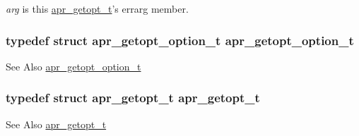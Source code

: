 {\itshape arg} is this {\ttfamily \hyperlink{structapr__getopt__t}{apr\-\_\-getopt\-\_\-t}'s} {\ttfamily errarg} member. \hypertarget{group__apr__getopt_ga114d2af52f3573eaeee2ffa73b2c4ff5}{
\subsubsection[{apr\-\_\-getopt\-\_\-option\-\_\-t}]{\setlength{\rightskip}{0pt plus 5cm}typedef struct {\bf apr\-\_\-getopt\-\_\-option\-\_\-t} {\bf apr\-\_\-getopt\-\_\-option\-\_\-t}}}\label{group__apr__getopt_ga114d2af52f3573eaeee2ffa73b2c4ff5}
\begin{DoxySeeAlso}{See Also}
\hyperlink{structapr__getopt__option__t}{apr\-\_\-getopt\-\_\-option\-\_\-t} 
\end{DoxySeeAlso}
\hypertarget{group__apr__getopt_gaed49565eab64803e93f76d0c40d6873d}{
\subsubsection[{apr\-\_\-getopt\-\_\-t}]{\setlength{\rightskip}{0pt plus 5cm}typedef struct {\bf apr\-\_\-getopt\-\_\-t} {\bf apr\-\_\-getopt\-\_\-t}}}\label{group__apr__getopt_gaed49565eab64803e93f76d0c40d6873d}
\begin{DoxySeeAlso}{See Also}
\hyperlink{structapr__getopt__t}{apr\-\_\-getopt\-\_\-t} 
\end{DoxySeeAlso}


